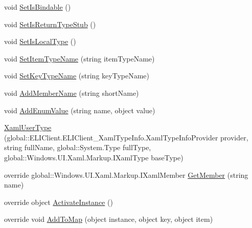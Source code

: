 \begin{DoxyCompactItemize}
\item 
void \hyperlink{class_e_l_i_client_1_1_e_l_i_client___xaml_type_info_1_1_xaml_user_type_a78e1655dc00ebc2b19fc635a881e4b38}{Set\+Is\+Bindable} ()
\item 
void \hyperlink{class_e_l_i_client_1_1_e_l_i_client___xaml_type_info_1_1_xaml_user_type_a20f13f430b27304972385249b0ae8613}{Set\+Is\+Return\+Type\+Stub} ()
\item 
void \hyperlink{class_e_l_i_client_1_1_e_l_i_client___xaml_type_info_1_1_xaml_user_type_af6a3dfcb7a63cac842cc635578a7722b}{Set\+Is\+Local\+Type} ()
\item 
void \hyperlink{class_e_l_i_client_1_1_e_l_i_client___xaml_type_info_1_1_xaml_user_type_a85efcc8b7d9e26f390e400af5767d25d}{Set\+Item\+Type\+Name} (string item\+Type\+Name)
\item 
void \hyperlink{class_e_l_i_client_1_1_e_l_i_client___xaml_type_info_1_1_xaml_user_type_a8a9dec2e38ff7e47ce65fab2dbf9346f}{Set\+Key\+Type\+Name} (string key\+Type\+Name)
\item 
void \hyperlink{class_e_l_i_client_1_1_e_l_i_client___xaml_type_info_1_1_xaml_user_type_a7cc17534014002de27e44ac41b40b4c0}{Add\+Member\+Name} (string short\+Name)
\item 
void \hyperlink{class_e_l_i_client_1_1_e_l_i_client___xaml_type_info_1_1_xaml_user_type_afd9db55de0391c8a7216e6bce2f3d675}{Add\+Enum\+Value} (string name, object value)
\item 
\hyperlink{class_e_l_i_client_1_1_e_l_i_client___xaml_type_info_1_1_xaml_user_type_a909746a87650e014303a361f94cf2fa9}{Xaml\+User\+Type} (global\+::\+E\+L\+I\+Client.\+E\+L\+I\+Client\+\_\+\+Xaml\+Type\+Info.\+Xaml\+Type\+Info\+Provider provider, string full\+Name, global\+::\+System.\+Type full\+Type, global\+::\+Windows.\+U\+I.\+Xaml.\+Markup.\+I\+Xaml\+Type base\+Type)
\item 
override global\+::\+Windows.\+U\+I.\+Xaml.\+Markup.\+I\+Xaml\+Member \hyperlink{class_e_l_i_client_1_1_e_l_i_client___xaml_type_info_1_1_xaml_user_type_ae0b59b2b8f38cd92bb7b5104832683cd}{Get\+Member} (string name)
\item 
override object \hyperlink{class_e_l_i_client_1_1_e_l_i_client___xaml_type_info_1_1_xaml_user_type_ab0cbcd619f25fa68eee6c3472c28d8f8}{Activate\+Instance} ()
\item 
override void \hyperlink{class_e_l_i_client_1_1_e_l_i_client___xaml_type_info_1_1_xaml_user_type_aaae5b06ef5d7b0332b2517490a148da3}{Add\+To\+Map} (object instance, object key, object item)
\item 

\end{DoxyCompactItemize}
